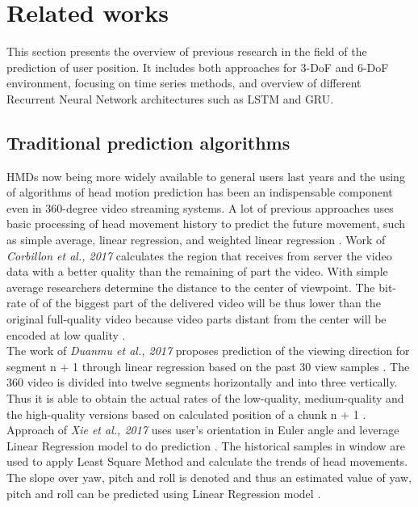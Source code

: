 \section{Related works}
\label{sec:related}
This section presents the overview of previous research in the field of the prediction of user position. It includes both approaches for 3-DoF and 6-DoF environment, focusing on time series methods, and overview of different Recurrent Neural Network architectures such as LSTM and GRU.  


\subsection{Traditional prediction algorithms}
\label{sec:related:timeseries}
HMDs now being more widely available to general users last years and the using of algorithms of head motion prediction has been an indispensable component even in 360-degree video streaming systems. A lot of previous approaches uses basic processing of head movement history to predict the future movement, such as simple average, linear regression, and weighted linear regression \cite{attention_saliency}. Work of \textit{Corbillon et al., 2017} calculates the region that receives from server the video data with a better quality than the remaining of part the video. With simple average researchers determine the distance to the center of viewpoint. The bit-rate of of the biggest part of the delivered video will be thus lower than the original full-quality video because video parts distant from the center will be encoded at low quality \cite{simple_average}.\\
The work of \textit{Duanmu et al., 2017} proposes prediction of the viewing direction for segment n + 1 through linear regression based on the past 30 view samples \cite{linreg1}. The 360 video is divided into twelve segments horizontally and into three vertically. Thus it is able to obtain the actual rates of the low-quality, medium-quality and the high-quality versions based on calculated position of a chunk n + 1 \cite{linreg1}.\\
Approach of \textit{Xie et al., 2017} uses user’s orientation in Euler angle and leverage Linear Regression model to do prediction \cite{linreg2}. The historical samples in window are used to apply Least Square Method and calculate the trends of head movements. The slope over yaw, pitch and roll is denoted and thus an estimated value of yaw, pitch and roll can be predicted using Linear Regression model \cite{linreg2}.\\
